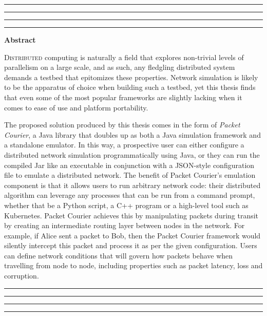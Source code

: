 \thispagestyle{empty}
\hrule\hrule\hrule\hrule %
\begin{center}
    \textbf{\large Abstract}
    \\
\end{center}

\lettrine{D}{istributed} computing is naturally a field that explores non-trivial levels of parallelism on a large
scale, and as such, any fledgling distributed system demands a testbed that epitomizes these properties. Network
simulation is likely to be the apparatus of choice when building such a testbed, yet this thesis finds that even
some of the most popular frameworks are slightly lacking when it comes to ease of use and platform portability.

The proposed solution produced by this thesis comes in the form of \emph{Packet Courier}, a Java library that doubles
up as both a Java simulation framework and a standalone emulator. In this way, a prospective user can either
configure a distributed network simulation programmatically using Java, or they can run the compiled Jar like an
executable in conjunction with a JSON-style configuration file to emulate a distributed network. The benefit of
Packet Courier's emulation component is that it allows users to run arbitrary network code: their distributed
algorithm can leverage any processes that can be run from a command prompt, whether that be a Python script, a
C++ program or a high-level tool such as Kubernetes. Packet Courier achieves this by manipulating packets during
transit by creating an intermediate routing layer between nodes in the network. For example, if Alice sent a packet
to Bob, then the Packet Courier framework would silently intercept this packet and process it as per the given
configuration. Users can define network conditions that will govern how packets behave when travelling from node to
node, including properties such as packet latency, loss and corruption.


\vfill
\hrule\hrule\hrule\hrule
\clearpage
